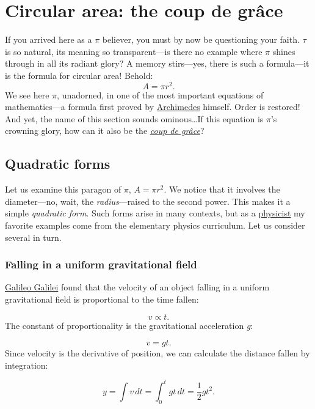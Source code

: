 \documentclass{article}
\begin{document}
\section{Circular area: the coup de gr\^{a}ce} %
\label{sec:circular_area}

If you arrived here as a $\pi$ believer, you must by now be questioning your faith. $\tau$ is so natural, its meaning so transparent---is there no example where $\pi$ shines through in all its radiant glory? A memory stirs---yes, there is such a formula---it is the formula for circular area! Behold:
\[ A = \pi r^2. \]
We see here $\pi$, unadorned, in one of the most important equations of mathematics---a formula first proved by \href{Archimedes}{Archimedes} himself. Order is restored! And yet, the name of this section sounds ominous\ldots If this equation is $\pi$'s crowning glory, how can it also be the \href{http://en.wikipedia.org/wiki/Coup_de_grace}{\emph{coup de gr\^{a}ce}}?


  \subsection{Quadratic forms} %
  \label{sec:quadratic_forms}

Let us examine this paragon of $\pi$, $A = \pi r^2$. We notice that it involves the diameter---no, wait, the \emph{radius}---raised to the second power. This makes it a simple \emph{quadratic form}. Such forms arise in many contexts, but as a \href{http://thesis.library.caltech.edu/1940/}{physicist} my favorite examples come from the elementary physics curriculum. Let us consider several in turn.

    \subsubsection{Falling in a uniform gravitational field} %
    \label{sec:falling_in_a_uniform_gravitational_field}

\href{http://en.wikipedia.org/wiki/Galileo_Galilei}{Galileo Galilei} found that the velocity of an object falling in a uniform gravitational field is proportional to the time fallen:

\[ v \propto t. \]
The constant of proportionality is the gravitational acceleration \emph{g}:

\[ v = g t. \]
Since velocity is the derivative of position, we can calculate the distance fallen by integration:

\[ y = \int v\,dt = \int_0^t gt\,dt = \textstyle{\frac{1}{2}} gt^2. \]
\end{document}
